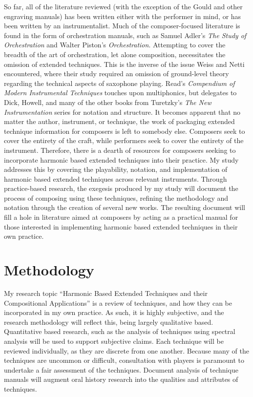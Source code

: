 So far, all of the literature reviewed (with the exception of the Gould and other engraving manuals) has been written either with the performer in mind, or has been written by an instrumentalist. 
Much of the composer-focused literature is found in the form of orchestration manuals, such as Samuel Adler’s \emph{The Study of Orchestration} and Walter Piston’s \emph{Orchestration}.\autocite{adlerStudyOrchestration2002, pistonOrchestration1969} 
Attempting to cover the breadth of the art of orchestration, let alone composition, necessitates the omission of extended techniques. 
This is the inverse of the issue Weiss and Netti encountered, where their study required an omission of ground-level theory regarding the technical aspects of saxophone playing. 
Read’s \emph{Compendium of Modern Instrumental Techniques} touches upon multiphonics, but delegates to Dick, Howell, and many of the other books from Turetzky’s \emph{The New Instrumentation} series for notation and structure.\autocite[160]{readCompendiumModernInstrumental1993} 
It becomes apparent that no matter the author, instrument, or technique, the work of packaging extended technique information for composers is left to somebody else. 
Composers seek to cover the entirety of the craft, while performers seek to cover the entirety of the instrument. 
Therefore, there is a dearth of resources for composers seeking to incorporate harmonic based extended techniques into their practice. 
My study addresses this by covering the playability, notation, and implementation of harmonic based extended techniques across relevant instruments. 
Through practice-based research, the exegesis produced by my study will document the process of composing using these techniques, refining the methodology and notation through the creation of several new works. 
The resulting document will fill a hole in literature aimed at composers by acting as a practical manual for those interested in implementing harmonic based extended techniques in their own practice.


\newpage

\section{Methodology}
My research topic “Harmonic Based Extended Techniques and their Compositional Applications” is a review of techniques, and how they can be incorporated in my own practice. 
As such, it is highly subjective, and the research methodology will reflect this, being largely qualitative based. 
Quantitative based research, such as the analysis of techniques using spectral analysis will be used to support subjective claims. 
Each technique will be reviewed individually, as they are discrete from one another. 
Because many of the techniques are uncommon or difficult, consultation with players is paramount to undertake a fair assessment of the techniques. 
Document analysis of technique manuals will augment oral history research into the qualities and attributes of techniques.

